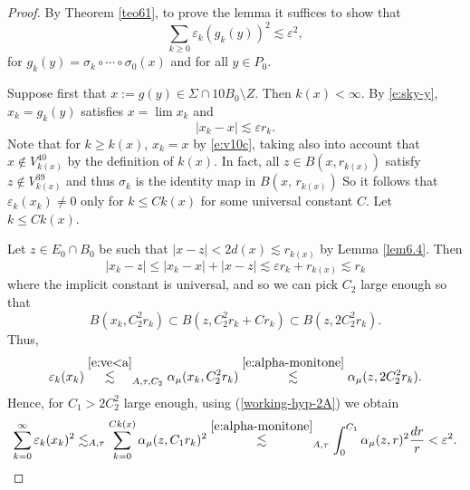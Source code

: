 \documentclass[11pt]{amsart}
\newcommand{\rf}[1]{{(\ref{#1})}}
\newcommand{\ve}{{\varepsilon}}
\theoremstyle{definition}
\theoremstyle{remark}
\numberwithin{equation}{section}
\def\lec{\lesssim}
\def\lec{\lesssim}
\newcommand{\jonas}[1]{}%
\begin{document}
\begin{proof}
By Theorem \ref{teo61}, to prove the lemma it suffices to show that 
\begin{equation}\label{sum-bound}
\sum_{k\geq 0} \ve_{k}(g_{k}(y))^{2}\lesssim\ve^2,
\end{equation}
for $g_{k}(y)= \sigma_{k}\circ\cdots \circ \sigma_{0}(x)$ and for all $y\in P_{0}$.

		
Suppose first that $x:=g(y)\in \Sigma\cap 10B_{0}\setminus  Z$. 
Then $k(x)<\infty$.
By \eqref{e:sky-y},  $x_{k}=g_{k}(y)$ satisfies $x=\lim x_{k}$ and 
\[
|x_{k}-x|\lec \ve r_{k}.
\]
Note that for $k\geq k(x)$, 
 $x_{k}=x$ by \eqref{e:v10c}, taking also into account that $x\not\in V_{k(x)}^{40}$ by the definition of $k(x)$. In fact, all $z\in B(x,r_{k(x)})$ satisfy $z\not\in V_{k(x)}^{39}$ and thus
 $\sigma_{k}$ is the identity map in $B(x,\,r_{k(x)})$ %
So it follows that $\ve_{k}(x_{k})\neq0$ only for $k\leq Ck(x)$ for some universal constant $C$. \jonas{I added here and below $Ck(x)$ instead of $k(x)$, since $\ve_{k}$ asks for points in a large ball of size like $100r_k$.} %
Let $k\leq Ck(x)$. 

Let $z\in E_{0}\cap B_{0}$ be such that $|x-z|<2d(x)\lec r_{k(x)}$ by Lemma \ref{lem6.4}. Then %
\[
|x_{k}-z|\leq |x_{k}-x|+|x-z|\lec \ve r_{k}+ r_{k(x)} \lec   r_{k}\]
where the implicit constant is universal, and so we can pick $C_{2}$ large enough so that 
\begin{equation}\label{6.30A}
B(x_{k},C_{2}^2r_{k})
\subset B(z,C_{2}^2 r_{k}+C r_{k})
\subset B(z,2C_{2}^2r_{k}).
\end{equation}
Thus,
\begin{equation}\label{6.30B}
\ve_{k}(x_{k})
\stackrel{\eqref{e:ve<a}}{\lec}_{A,\tau,C_2}\alpha_{\mu}(x_{k},C_{2}^2 r_{k})
\stackrel{\eqref{e:alpha-monitone}}{\lec} \alpha_{\mu}(z,2C_{2}^2 r_{k}).
\end{equation}
Hence, for $C_{1}>2C_2^2$ large enough, using \rf{working-hyp-2A} we obtain
\begin{equation}\label{6.30C}
\sum_{k= 0}^{\infty}\ve_{k}(x_{k})^{2} 
\lec_{A,\tau}  \sum_{k=0}^{Ck(x)} \alpha_{\mu}(z, C_{1} r_{k})^{2} 
\stackrel{\eqref{e:alpha-monitone}}{\lec}_{A,\tau} \int_{0}^{C_{1}} \alpha_{\mu}(z,r)^{2} \frac{dr}{r}<\ve^{2}.
\end{equation}


\end{proof}
\end{document}
